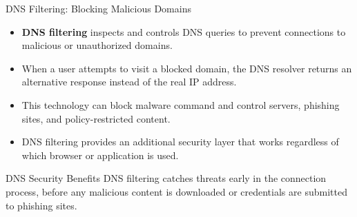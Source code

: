 \documentclass{beamer}
\begin{document}
                \begin{frame}{DNS Filtering: Blocking Malicious Domains}
                    \begin{itemize}
                        \item \textbf{DNS filtering} inspects and controls DNS queries to prevent connections to malicious or unauthorized domains.
                        \item When a user attempts to visit a blocked domain, the DNS resolver returns an alternative response instead of the real IP address.
                        \item This technology can block malware command and control servers, phishing sites, and policy-restricted content.
                        \item DNS filtering provides an additional security layer that works regardless of which browser or application is used.
                    \end{itemize}
                    
                    \begin{alertblock}{DNS Security Benefits}
                    DNS filtering catches threats early in the connection process, before any malicious content is downloaded or credentials are submitted to phishing sites.
                    \end{alertblock}
                    \end{frame}
                    
\end{document}
